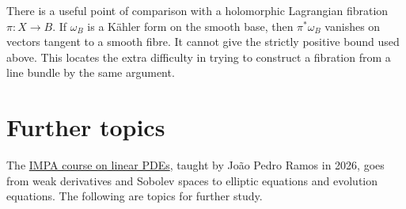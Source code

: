 There is a useful point of comparison
with a holomorphic Lagrangian fibration
$\pi:X\to B$. If $\omega_B$ is a
K\"ahler form on the smooth base, then
$\pi^*\omega_B$ vanishes on vectors
tangent to a smooth fibre. It cannot give
the strictly positive bound used above.
This locates the extra difficulty in
trying to construct a fibration from a
line bundle by the same argument.

\section{Further topics}
\label{section-further-pde}

The \href{https://impa.br/disciplina/%
equacoes-diferenciais-parciais-%
teoria-linear/%
}{IMPA course on linear PDEs}, taught by
Jo\~ao Pedro Ramos in 2026, goes from weak
derivatives and Sobolev spaces to elliptic
equations and evolution equations. The
following are topics for further study.

